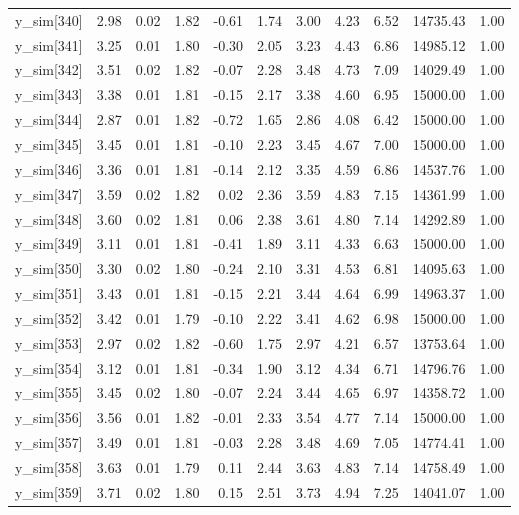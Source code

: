 \begin{table}[ht]
\begin{tabular}{rrrrrrrrrrr}
  y\_sim[340] & 2.98 & 0.02 & 1.82 & -0.61 & 1.74 & 3.00 & 4.23 & 6.52 & 14735.43 & 1.00 \\ 
  y\_sim[341] & 3.25 & 0.01 & 1.80 & -0.30 & 2.05 & 3.23 & 4.43 & 6.86 & 14985.12 & 1.00 \\ 
  y\_sim[342] & 3.51 & 0.02 & 1.82 & -0.07 & 2.28 & 3.48 & 4.73 & 7.09 & 14029.49 & 1.00 \\ 
  y\_sim[343] & 3.38 & 0.01 & 1.81 & -0.15 & 2.17 & 3.38 & 4.60 & 6.95 & 15000.00 & 1.00 \\ 
  y\_sim[344] & 2.87 & 0.01 & 1.82 & -0.72 & 1.65 & 2.86 & 4.08 & 6.42 & 15000.00 & 1.00 \\ 
  y\_sim[345] & 3.45 & 0.01 & 1.81 & -0.10 & 2.23 & 3.45 & 4.67 & 7.00 & 15000.00 & 1.00 \\ 
  y\_sim[346] & 3.36 & 0.01 & 1.81 & -0.14 & 2.12 & 3.35 & 4.59 & 6.86 & 14537.76 & 1.00 \\ 
  y\_sim[347] & 3.59 & 0.02 & 1.82 & 0.02 & 2.36 & 3.59 & 4.83 & 7.15 & 14361.99 & 1.00 \\ 
  y\_sim[348] & 3.60 & 0.02 & 1.81 & 0.06 & 2.38 & 3.61 & 4.80 & 7.14 & 14292.89 & 1.00 \\ 
  y\_sim[349] & 3.11 & 0.01 & 1.81 & -0.41 & 1.89 & 3.11 & 4.33 & 6.63 & 15000.00 & 1.00 \\ 
  y\_sim[350] & 3.30 & 0.02 & 1.80 & -0.24 & 2.10 & 3.31 & 4.53 & 6.81 & 14095.63 & 1.00 \\ 
  y\_sim[351] & 3.43 & 0.01 & 1.81 & -0.15 & 2.21 & 3.44 & 4.64 & 6.99 & 14963.37 & 1.00 \\ 
  y\_sim[352] & 3.42 & 0.01 & 1.79 & -0.10 & 2.22 & 3.41 & 4.62 & 6.98 & 15000.00 & 1.00 \\ 
  y\_sim[353] & 2.97 & 0.02 & 1.82 & -0.60 & 1.75 & 2.97 & 4.21 & 6.57 & 13753.64 & 1.00 \\ 
  y\_sim[354] & 3.12 & 0.01 & 1.81 & -0.34 & 1.90 & 3.12 & 4.34 & 6.71 & 14796.76 & 1.00 \\ 
  y\_sim[355] & 3.45 & 0.02 & 1.80 & -0.07 & 2.24 & 3.44 & 4.65 & 6.97 & 14358.72 & 1.00 \\ 
  y\_sim[356] & 3.56 & 0.01 & 1.82 & -0.01 & 2.33 & 3.54 & 4.77 & 7.14 & 15000.00 & 1.00 \\ 
  y\_sim[357] & 3.49 & 0.01 & 1.81 & -0.03 & 2.28 & 3.48 & 4.69 & 7.05 & 14774.41 & 1.00 \\ 
  y\_sim[358] & 3.63 & 0.01 & 1.79 & 0.11 & 2.44 & 3.63 & 4.83 & 7.14 & 14758.49 & 1.00 \\ 
  y\_sim[359] & 3.71 & 0.02 & 1.80 & 0.15 & 2.51 & 3.73 & 4.94 & 7.25 & 14041.07 & 1.00 \\ 

\end{tabular}
\end{table}
